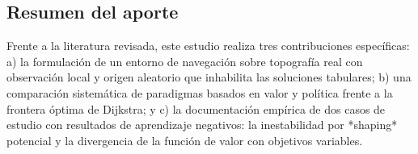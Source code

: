 \subsection{Resumen del aporte}
Frente a la literatura revisada, este estudio realiza tres contribuciones específicas: a) la formulación de un entorno de navegación sobre topografía real con observación local y origen aleatorio que inhabilita las soluciones tabulares; b) una comparación sistemática de paradigmas basados en valor y política frente a la frontera óptima de Dijkstra; y c) la documentación empírica de dos casos de estudio con resultados de aprendizaje negativos: la inestabilidad por *shaping* potencial y la divergencia de la función de valor con objetivos variables.
